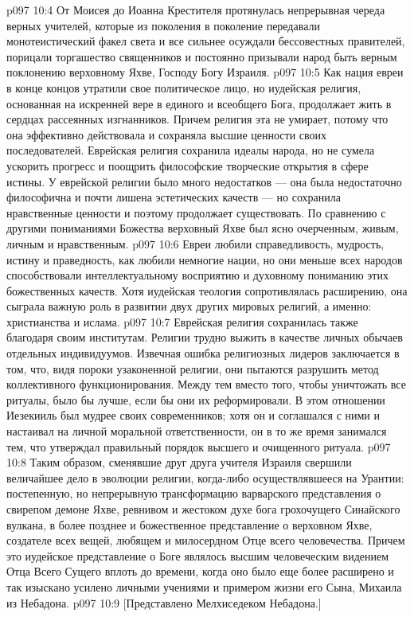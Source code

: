 \vs p097 10:4 От Моисея до Иоанна Крестителя протянулась непрерывная череда верных учителей, которые из поколения в поколение передавали монотеистический факел света и все сильнее осуждали бессовестных правителей, порицали торгашество священников и постоянно призывали народ быть верным поклонению верховному Яхве, Господу Богу Израиля.
\vs p097 10:5 \pc Как нация евреи в конце концов утратили свое политическое лицо, но иудейская религия, основанная на искренней вере в единого и всеобщего Бога, продолжает жить в сердцах рассеянных изгнанников. Причем религия эта не умирает, потому что она эффективно действовала и сохраняла высшие ценности своих последователей. Еврейская религия сохранила идеалы народа, но не сумела ускорить прогресс и поощрить философские творческие открытия в сфере истины. У еврейской религии было много недостатков --- она была недостаточно философична и почти лишена эстетических качеств --- но сохранила нравственные ценности и поэтому продолжает существовать. По сравнению с другими пониманиями Божества верховный Яхве был ясно очерченным, живым, личным и нравственным.
\vs p097 10:6 Евреи любили справедливость, мудрость, истину и праведность, как любили немногие нации, но они меньше всех народов способствовали интеллектуальному восприятию и духовному пониманию этих божественных качеств. Хотя иудейская теология сопротивлялась расширению, она сыграла важную роль в развитии двух других мировых религий, а именно: христианства и ислама.
\vs p097 10:7 Еврейская религия сохранилась также благодаря своим институтам. Религии трудно выжить в качестве личных обычаев отдельных индивидуумов. Извечная ошибка религиозных лидеров заключается в том, что, видя пороки узаконенной религии, они пытаются разрушить метод коллективного функционирования. Между тем вместо того, чтобы уничтожать все ритуалы, было бы лучше, если бы они их реформировали. В этом отношении Иезекииль был мудрее своих современников; хотя он и соглашался с ними и настаивал на личной моральной ответственности, он в то же время занимался тем, что утверждал правильный порядок высшего и очищенного ритуала.
\vs p097 10:8 \pc Таким образом, сменявшие друг друга учителя Израиля свершили величайшее дело в эволюции религии, когда\hyp{}либо осуществлявшееся на Урантии: постепенную, но непрерывную трансформацию варварского представления о свирепом демоне Яхве, ревнивом и жестоком духе бога грохочущего Синайского вулкана, в более позднее и божественное представление о верховном Яхве, создателе всех вещей, любящем и милосердном Отце всего человечества. Причем это иудейское представление о Боге являлось высшим человеческим видением Отца Всего Сущего вплоть до времени, когда оно было еще более расширено и так изыскано усилено личными учениями и примером жизни его Сына, Михаила из Небадона.
\vsetoff
\vs p097 10:9 [Представлено Мелхиседеком Небадона.]
